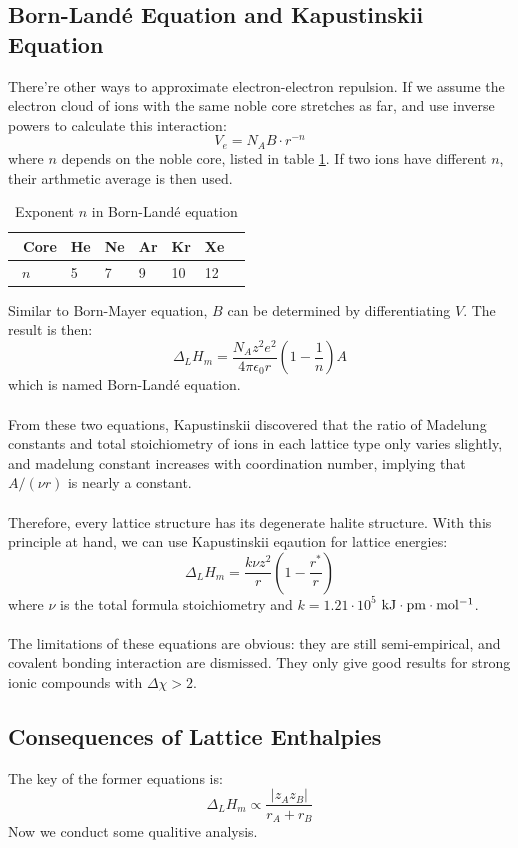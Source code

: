 \subsection{Born-Land\'e Equation and Kapustinskii Equation}
%
There're other ways to approximate electron-electron repulsion. 
If we assume the electron cloud of ions with the same noble core stretches as far, 
and use inverse powers to calculate this interaction:
%
\[
	V_e = N_AB\cdot r^{-n}
\]
%
where $n$ depends on the noble core, listed in table \ref{lande}. 
If two ions have different $n$, their arthmetic average is then used.
%
\begin{table}
	\centering
	\begin{tabular}{@{}llllll@{}}
		\toprule
		\ \textbf{Core}	&	He	&	Ne 	&	Ar	&	Kr	&	Xe 	\ \\
		\midrule
		\ $n$			&	5	&	7	&	9	&	10	&	12	\ \\
		\bottomrule
	\end{tabular}
	\caption{Exponent $n$ in Born-Land\'e equation}
	\label{lande}
\end{table}
%
Similar to Born-Mayer equation, $B$ can be determined by differentiating $V$. The result is then:
%
\[
	\Delta_LH_m = \frac{N_Az^2e^2}{4\pi\epsilon_0r}
	\left(1-\frac{1}{n}\right)A
\]
%
which is named Born-Land\'e equation.\\ \\
%
From these two equations, Kapustinskii discovered that 
the ratio of Madelung constants and total stoichiometry of ions in each lattice type only varies slightly, 
and madelung constant increases with coordination number, implying that $A/(\nu r)$ is nearly a constant.\\ \\
%
Therefore, every lattice structure has its degenerate halite structure. 
With this principle at hand, we can use Kapustinskii eqaution for lattice energies:
%
\[
	\Delta_LH_m = \frac{k\nu z^2}{r}\left(1-\frac{r^*}{r}\right)
\]
where $\nu$ is the total formula stoichiometry and $k=1.21\cdot10^5$ $\rm kJ\cdot pm\cdot mol^{-1}$.\\ \\
%
The limitations of these equations are obvious: 
they are still semi-empirical, and covalent bonding interaction are dismissed. 
They only give good results for strong ionic compounds with $\Delta\chi >2$.
%
\subsection{Consequences of Lattice Enthalpies}
%
The key of the former equations is:
%
\[
	\Delta_LH_m \propto \frac{|z_Az_B|}{r_A+r_B}
\]
%
Now we conduct some qualitive analysis.
%

